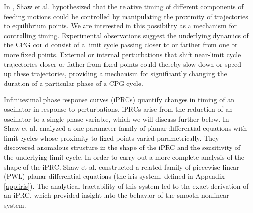 \documentclass[12pt]{article}
\begin{document}
 In \cite{ShawParkChielThomas2012SIADS}, Shaw et al. hypothesized that the relative timing of different components of feeding motions could be controlled by manipulating the proximity of trajectories to equilibrium points.  We are interested in this possibility as a mechanism for controlling timing.  Experimental observations suggest the underlying dynamics of the CPG could consist of a limit cycle passing closer to or farther from one or more fixed points.  External or internal perturbations that shift near-limit cycle trajectories closer or father from fixed points could thereby slow down or speed up these trajectories, providing a mechanism for significantly changing the duration of a particular phase of a CPG cycle.
 
   Infinitesimal phase response curves (iPRCs) quantify changes in timing of an oscillator in response to perturbations. iPRCs arise from the reduction of an oscillator to a single phase variable, which we will discuss further below.  In \cite{ShawParkChielThomas2012SIADS}, Shaw et al. analyzed a one-parameter family of planar differential equations with limit cycles whose proximity to fixed points varied parametrically.  They discovered anomalous structure in the shape of the iPRC and the sensitivity of the underlying limit cycle.  In order to carry out a more complete analysis of the shape of the iPRC, Shaw et al. constructed a related family of piecewise linear (PWL) planar differential equations (the iris system, defined in Appendix \ref{app:iris}).  The analytical tractability of this system led to the exact derivation of an iPRC, which provided insight into the 
behavior of the smooth nonlinear system.
   
\end{document}

